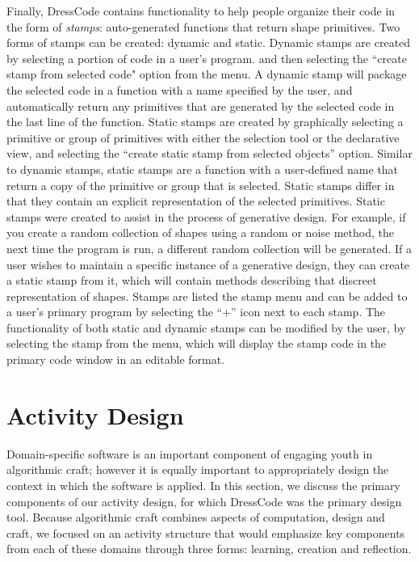 \documentclass{sigchi}
\begin{document}
Finally, DressCode contains functionality to help people organize their code in the form of \textit{stamps}: auto-generated functions that return shape primitives. Two forms of stamps can be created: dynamic and static. Dynamic stamps are created by selecting a portion of code in a user's program. and then selecting the ``create stamp from selected code" option from the menu. A dynamic stamp will package the selected code in a function with a name specified by the user, and automatically return any primitives that are generated by the selected code in the last line of the function. Static stamps are created by graphically selecting a primitive or group of primitives with either the selection tool or the declarative view, and selecting the ``create static stamp from selected objects'' option. Similar to dynamic stamps, static stamps are a function with a user-defined name that return a copy of the primitive or group that is selected. Static stamps differ in that they contain an explicit representation of the selected primitives. Static stamps were created to assist in the process of generative design. For example, if you create a random collection of shapes using a random or noise method, the next time the program is run, a different random collection will be generated. If a user wishes to maintain a specific instance of a generative design, they can create a static stamp from it, which will contain methods describing that discreet representation of shapes. Stamps are listed the stamp menu and can be added to a user's primary program by selecting the ``+'' icon next to each stamp. The functionality of both static and dynamic stamps can be modified by the user, by selecting the stamp from the menu, which will display the stamp code in the primary code window in an editable format.


\section{Activity Design}
Domain-specific software is an important component of engaging youth in algorithmic craft; however it is equally important to appropriately design the context in which the software is applied. In this section, we discuss the primary components of our activity design, for which DressCode was the primary design tool. 
Because algorithmic craft combines aspects of computation, design and craft, we focused on an activity structure that would emphasize key components from each of these domains through three forms: learning, creation and reflection. 
\end{document}
